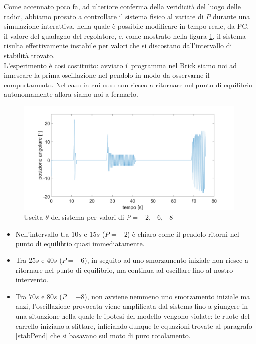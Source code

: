 Come accennato poco fa, ad ulteriore conferma della veridicità del luogo delle radici, abbiamo provato a controllare il sistema fisico al variare di $P$ durante una simulazione interattiva, nella quale è possibile modificare in tempo reale, da PC, il valore del guadagno del regolatore, e, come mostrato nella figura \ref{variazioneGainP}, il sistema risulta effettivamente instabile per valori che si discostano dall'intervallo di stabilità trovato.\\
L'esperimento è così costituito: avviato il programma nel Brick siamo noi ad innescare la prima oscillazione nel pendolo in modo da osservarne il comportamento. Nel caso in cui esso non riesca a ritornare nel punto di equilibrio autonomamente allora siamo noi a fermarlo.
\begin{figure}[ht]
	\centering
	\includegraphics[width=\linewidth]{variazioneGainP.png}
	\caption{Uscita $\theta$ del sistema per valori di $P=-2,-6,-8$}
	\label{variazioneGainP}
\end{figure}
\begin{itemize}
	\item Nell'intervallo tra $10s$ e $15s$ ($P=-2$) è chiaro come il pendolo ritorni nel punto di equilibrio quasi immediatamente.
	\item Tra $25s$ e $40s$ ($P=-6$), in seguito ad uno smorzamento iniziale non riesce a ritornare nel punto di equilibrio, ma continua ad oscillare fino al nostro intervento.
	\item Tra $70s$ e $80s$ ($P=-8$), non avviene nemmeno uno smorzamento iniziale ma anzi, l'oscillazione provocata viene amplificata dal sistema fino a giungere in una situazione nella quale le ipotesi del modello vengono violate: le ruote del carrello iniziano a slittare, inficiando dunque le equazioni trovate al paragrafo \ref{stabPend} che si basavano sul moto di puro rotolamento.
\end{itemize}

